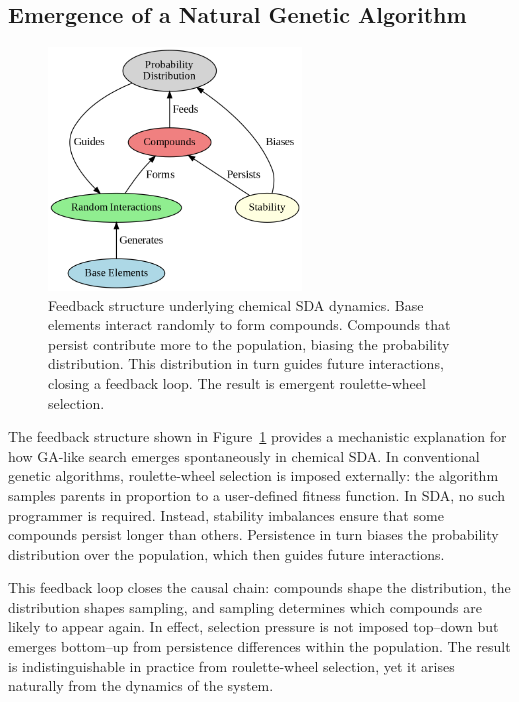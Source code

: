 \documentclass[life,article,submit,pdftex,moreauthors]{Definitions/mdpi}
\begin{document}
\subsection{Emergence of a Natural Genetic Algorithm}

\begin{figure}[H]
    \centering
    \includegraphics[width=0.6\textwidth]{SDA-top-down.png}
    \caption{Feedback structure underlying chemical SDA dynamics. Base elements interact randomly to form compounds. Compounds that persist contribute more to the population, biasing the probability distribution. This distribution in turn guides future interactions, closing a feedback loop. The result is emergent roulette-wheel selection.}
    \label{fig:top-down}
\end{figure}

The feedback structure shown in Figure~\ref{fig:top-down} provides a mechanistic explanation for how GA-like search emerges spontaneously in chemical SDA. In conventional genetic algorithms, roulette-wheel selection is imposed externally: the algorithm samples parents in proportion to a user-defined fitness function. In SDA, no such programmer is required. Instead, stability imbalances ensure that some compounds persist longer than others. Persistence in turn biases the probability distribution over the population, which then guides future interactions. 

This feedback loop closes the causal chain: compounds shape the distribution, the distribution shapes sampling, and sampling determines which compounds are likely to appear again. In effect, selection pressure is not imposed top–down but emerges bottom–up from persistence differences within the population. The result is indistinguishable in practice from roulette-wheel selection, yet it arises naturally from the dynamics of the system.
\end{document}
